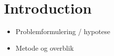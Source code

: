 \chapter{Introduction}
\label{cha:introduction}

\begin{itemize}
\item Problemformulering / hypotese
\item Metode og overblik
\end{itemize}

